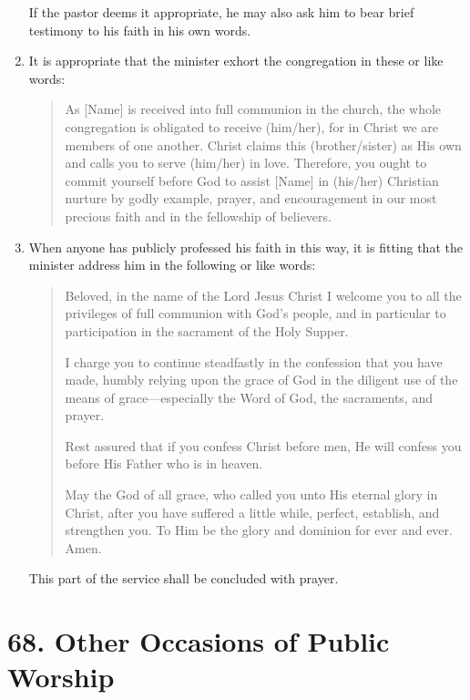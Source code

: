 \documentclass[
]{book}
\begin{document}
\begin{enumerate}
  If the pastor deems it appropriate, he may also ask him to bear brief testimony to his faith in his own words.
\item
  \protect\hypertarget{67.3}{\href{}{}}It is appropriate that the minister exhort the congregation in these or like words:

  \begin{quote}
  As {[}Name{]} is received into full communion in the church, the whole congregation is obligated to receive (him/her), for in Christ we are members of one another. Christ claims this (brother/sister) as His own and calls you to serve (him/her) in love. Therefore, you ought to commit yourself before God to assist {[}Name{]} in (his/her) Christian nurture by godly example, prayer, and encouragement in our most precious faith and in the fellowship of believers.
  \end{quote}
\item
  \protect\hypertarget{67.4}{\href{}{}}When anyone has publicly professed his faith in this way, it is fitting that the minister address him in the following or like words:

  \begin{quote}
  Beloved, in the name of the Lord Jesus Christ I welcome you to all the privileges of full communion with God's people, and in particular to participation in the sacrament of the Holy Supper.

  I charge you to continue steadfastly in the confession that you have made, humbly relying upon the grace of God in the diligent use of the means of grace---especially the Word of God, the sacraments, and prayer.

  Rest assured that if you confess Christ before men, He will confess you before His Father who is in heaven.

  May the God of all grace, who called you unto His eternal glory in Christ, after you have suffered a little while, perfect, establish, and strengthen you. To Him be the glory and dominion for ever and ever. Amen.
  \end{quote}

  This part of the service shall be concluded with prayer.
\end{enumerate}

\hypertarget{other-occasions-of-public-worship}{%
\section*{68. Other Occasions of Public Worship}\label{other-occasions-of-public-worship}}
\end{document}
